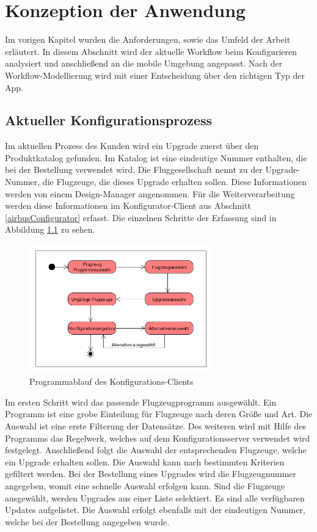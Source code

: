 \chapter{Konzeption der Anwendung}\label{chapter_3}
Im vorigen Kapitel wurden die Anforderungen, sowie das Umfeld der Arbeit erläutert. In diesem Abschnitt wird der aktuelle Workflow beim Konfigurieren analysiert und anschließend an die mobile Umgebung angepasst. Nach der Workflow-Modellierung wird mit einer Entscheidung über den richtigen Typ der App.

\section{Aktueller Konfigurationsprozess}
Im aktuellen Prozess des Kunden wird ein Upgrade zuerst über den Produktkatalog gefunden. Im Katalog ist eine eindeutige Nummer enthalten, die bei der Bestellung verwendet wird. Die Fluggesellschaft nennt zu der Upgrade-Nummer, die Flugzeuge, die dieses Upgrade erhalten sollen. Diese Informationen werden von einem Design-Manager angenommen. Für die Weiterverarbeitung werden diese Informationen im Konfigurator-Client aus Abschnitt \ref{airbusConfigurator} erfasst. Die einzelnen Schritte der Erfassung sind in Abbildung \ref{webguiWorkflow} zu sehen. \par
\begin{figure}
\label{webguiWorkflow}
\centering
\includegraphics[width=300px]{images/workflow_webgui}
\caption{Programmablauf des Konfigurations-Clients}
\end{figure}
Im ersten Schritt wird das passende Flugzeugprogramm ausgewählt. Ein Programm ist eine grobe Einteilung für Flugzeuge nach deren Größe und Art. Die Auswahl ist eine erste Filterung der Datensätze. Des weiteren wird mit Hilfe des Programms das Regelwerk, welches auf dem Konfigurationsserver verwendet wird festgelegt. Anschließend folgt die Auswahl der entsprechenden Flugzeuge, welche ein Upgrade erhalten sollen. Die Auswahl kann nach bestimmten Kriterien gefiltert werden. Bei der Bestellung eines Upgrades wird die Flugzeugnummer angegeben, womit eine schnelle Auswahl erfolgen kann. Sind die Flugzeuge ausgewählt, werden Upgrades aus einer Liste selektiert. Es sind alle verfügbaren Updates aufgelistet. Die Auswahl erfolgt ebenfalls mit der eindeutigen Nummer, welche bei der Bestellung angegeben wurde. \par 

